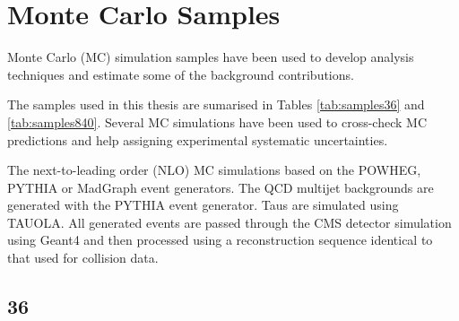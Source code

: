 \chapter{Monte Carlo Samples }
Monte Carlo (MC) simulation samples have been used to develop analysis
techniques and estimate some of the background contributions. 

The samples used in this thesis are sumarised in Tables \ref{tab:samples36} and
\ref{tab:samples840}.  Several MC simulations have been used to cross-check MC
predictions and help assigning experimental systematic uncertainties.

The next-to-leading order (NLO) MC simulations based on the
{POWHEG}\cite{powheg}, {PYTHIA}\cite{pythia} or {MadGraph}\cite{madgraph} event
generators.  
The QCD multijet backgrounds are generated with the {PYTHIA} event generator.
Taus are simulated using {TAUOLA}\cite{tauola}.  
All generated events are passed through the CMS detector simulation using
{Geant4} \cite{geant} and then processed using a reconstruction sequence
identical to that used for collision data. 

\newpage
\section{\unit{36}{\invpb}}

